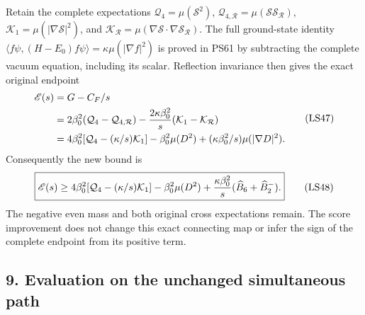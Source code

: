 \documentclass[11pt]{article}
\begin{document}
Retain the complete expectations
\(\mathcal Q_4=\mu(\mathcal S^2)\),
\(\mathcal Q_{4,\mathcal R}=\mu(\mathcal S\mathcal S_{\mathcal R})\),
\(\mathcal K_1=\mu(|\nabla\mathcal S|^2)\), and
\(\mathcal K_{\mathcal R}
=\mu(\nabla\mathcal S\cdot\nabla\mathcal S_{\mathcal R})\).
The full ground-state identity
\(\langle f\psi,(H-E_0)f\psi\rangle
=\kappa\mu(|\nabla f|^2)\) is proved in PS61 by subtracting
the complete vacuum equation, including its scalar.
Reflection invariance then gives the exact original endpoint
\[
 \begin{aligned}
 \mathscr E(s)&=G-C_F/s\\
 &=2\beta_0^2(\mathcal Q_4-\mathcal Q_{4,\mathcal R})
       -{2\kappa\beta_0^2\over s}
                            (\mathcal K_1-\mathcal K_{\mathcal R})\\
 &=4\beta_0^2[\mathcal Q_4-(\kappa/s)\mathcal K_1]
       -\beta_0^2\mu(D^2)
       +(\kappa\beta_0^2/s)\mu(|\nabla D|^2).
 \end{aligned}
 \tag{LS47}
\]
Consequently the new bound is
\[
 \boxed{\mathscr E(s)\ge
 4\beta_0^2[\mathcal Q_4-(\kappa/s)\mathcal K_1]
       -\beta_0^2\mu(D^2)
       +{\kappa\beta_0^2\over s}
                             (\widehat B_6+\widehat B_2^-).}
 \tag{LS48}
\]
The negative even mass and both original cross expectations remain.
The score improvement does not change this exact connecting map
or infer the sign of the complete endpoint from its positive term.

\subsection*{9. Evaluation on the unchanged simultaneous path}
\end{document}
